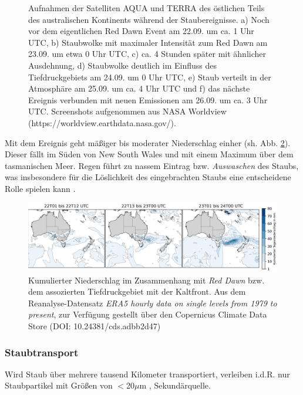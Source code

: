\documentclass[12pt,a4paper,onecolumn]{scrartcl}
\begin{document}
\begin{figure}[ht]
\begin{minipage}[c]{0.32\textwidth}
	\end{minipage}\hfill
\caption{Aufnahmen der Satelliten AQUA und TERRA des östlichen Teils des australischen Kontinents während der Staubereignisse. a) Noch vor dem eigentlichen Red Dawn Event am 22.09. um ca. 1 Uhr UTC, b) Staubwolke mit maximaler Intensität zum Red Dawn am 23.09. um etwa 0 Uhr UTC, c) ca. 4 Stunden später mit ähnlicher Ausdehnung, d) Staubwolke deutlich im Einfluss des Tiefdruckgebiets am 24.09. um 0 Uhr UTC, e) Staub verteilt in der Atmosphäre am 25.09. um ca. 4 Uhr UTC und f) das nächste Ereignis verbunden mit neuen Emissionen am 26.09. um ca. 3 Uhr UTC.  Screenshots aufgenommen aus NASA Worldview (https://worldview.earthdata.nasa.gov/).} \label{fig:satellite}
\end{figure}

Mit dem Ereignis geht mäßiger bis moderater Niederschlag einher (sh. Abb.  \ref{fig:rain}). Dieser fällt im Süden von New South Wales und mit einem Maximum über dem tasmanischen Meer. Regen führt zu nassem Eintrag bzw. \textit{Auswaschen} des Staubs, was insbesondere für die Löslichkeit des eingebrachten Staubs eine entscheidene Rolle spielen kann \citep{Gabric.2016}. 

\begin{figure}[ht]
\includegraphics[width=\textwidth]{bilder/reddawn/rain.png}
\caption{Kumulierter Niederschlag im Zusammenhang mit \textit{Red Dawn} bzw. dem assozierten Tiefdruckgebiet mit der Kaltfront. Aus dem Reanalyse-Datensatz \textit{ERA5 hourly data on single levels from 1979 to present}, zur Verfügung gestellt über den Copernicus Climate Data Store (DOI: 10.24381/cds.adbb2d47) } \label{fig:rain}
\end{figure}

\subsubsection{Staubtransport}
Wird Staub über mehrere tausend Kilometer transportiert, verleiben i.d.R. nur Staubpartikel mit Größen von $<$20$\mu$m \citep{Marx.2018}, Sekundärquelle.
\end{document}
